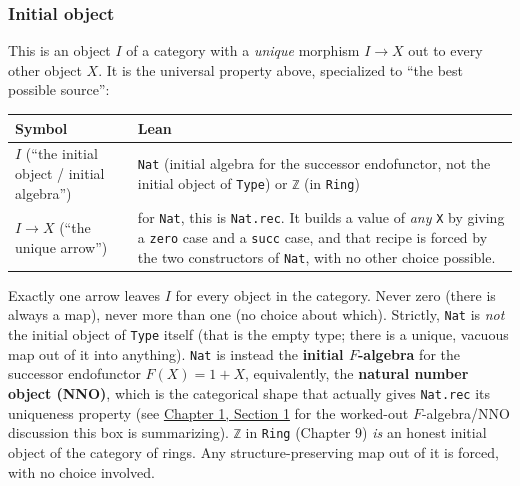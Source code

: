 \subsubsection{Initial object}\label{sec:02-terminology-and-coc:01-terminology:8}

This is an object \(I\) of a category with a \emph{unique} morphism \(I \to X\) out to every other object \(X\). It is the universal property above, specialized to ``the best possible source'':

\begin{center}

\end{center}

\begin{longtable}[]{@{}
  >{\raggedright\arraybackslash}p{}
  >{\raggedright\arraybackslash}p{}@{}}
\toprule\noalign{}
\begin{minipage}[b]{\linewidth}\raggedright
Symbol
\end{minipage} & \begin{minipage}[b]{\linewidth}\raggedright
Lean
\end{minipage} \\
\midrule\noalign{}
\endhead
\bottomrule\noalign{}
\endlastfoot
\(I\) (``the initial object / initial algebra'') & \texttt{Nat} (initial algebra for the successor endofunctor, not the initial object of \texttt{Type}) or \texttt{ℤ} (in \texttt{Ring}) \\
\(I \to X\) (``the unique arrow'') & for \texttt{Nat}, this is \texttt{Nat.rec}. It builds a value of \emph{any} \texttt{X} by giving a \texttt{zero} case and a \texttt{succ} case, and that recipe is forced by the two constructors of \texttt{Nat}, with no other choice possible. \\
\end{longtable}

Exactly one arrow leaves \(I\) for every object in the category. Never zero (there is always a map), never more than one (no choice about which). Strictly, \texttt{Nat} is \emph{not} the initial object of \texttt{Type} itself (that is the empty type; there is a unique, vacuous map out of it into anything). \texttt{Nat} is instead the \textbf{initial \(F\)-algebra} for the successor endofunctor \(F(X) = 1 + X\), equivalently, the \textbf{natural number object (NNO)}, which is the categorical shape that actually gives \texttt{Nat.rec} its uniqueness property (see \hyperref[sec:01-basics:01-everything-has-a-type:1]{Chapter 1, Section 1} for the worked-out \(F\)-algebra/NNO discussion this box is summarizing). \texttt{ℤ} in \texttt{Ring} (Chapter 9) \emph{is} an honest initial object of the category of rings. Any structure-preserving map out of it is forced, with no choice involved.

